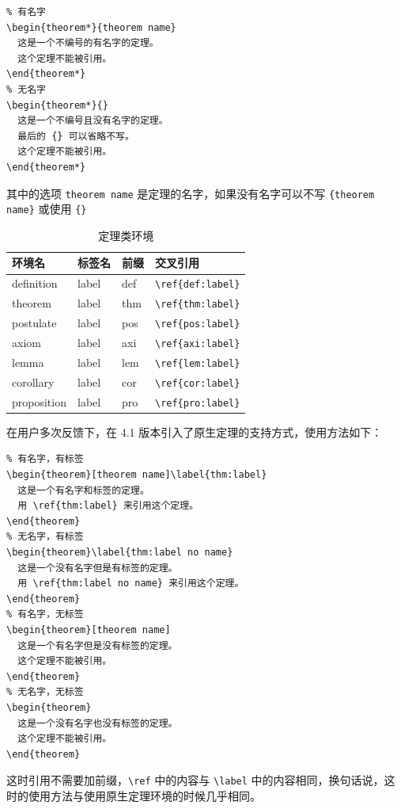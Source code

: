 \documentclass[lang=cn,newtx,10pt,scheme=chinese]{elegantbook}
\begin{document}
\begin{lstlisting}
% 有名字
\begin{theorem*}{theorem name}
  这是一个不编号的有名字的定理。
  这个定理不能被引用。
\end{theorem*}
% 无名字
\begin{theorem*}{}
  这是一个不编号且没有名字的定理。
  最后的 {} 可以省略不写。
  这个定理不能被引用。
\end{theorem*}
\end{lstlisting}
其中的选项 \lstinline{theorem name} 是定理的名字，如果没有名字可以不写 \lstinline|{theorem name}| 或使用 \lstinline|{}|

\begin{table}[htbp]
  \centering
  \caption{定理类环境}
    \begin{tabular}{llll}
    \toprule
    环境名 & 标签名 & 前缀 & 交叉引用 \\
    \midrule
    definition & label & def   & \lstinline|\ref{def:label}| \\
    theorem & label & thm   & \lstinline|\ref{thm:label}| \\
    postulate & label & pos & \lstinline|\ref{pos:label}| \\
    axiom & label & axi & \lstinline|\ref{axi:label}|\\
    lemma & label & lem   & \lstinline|\ref{lem:label}| \\
    corollary & label & cor   & \lstinline|\ref{cor:label}| \\
    proposition & label & pro   & \lstinline|\ref{pro:label}| \\
    \bottomrule
    \end{tabular}%
  \label{tab:theorem-class}%
\end{table}%

在用户多次反馈下，在 4.1 版本引入了原生定理的支持方式，使用方法如下：

\begin{lstlisting}
% 有名字，有标签
\begin{theorem}[theorem name]\label{thm:label}
  这是一个有名字和标签的定理。
  用 \ref{thm:label} 来引用这个定理。
\end{theorem}
% 无名字，有标签
\begin{theorem}\label{thm:label no name}
  这是一个没有名字但是有标签的定理。
  用 \ref{thm:label no name} 来引用这个定理。
\end{theorem}
% 有名字，无标签
\begin{theorem}[theorem name]
  这是一个有名字但是没有标签的定理。
  这个定理不能被引用。
\end{theorem}
% 无名字，无标签
\begin{theorem}
  这是一个没有名字也没有标签的定理。
  这个定理不能被引用。
\end{theorem}
\end{lstlisting}
这时引用不需要加前缀，\lstinline{\ref} 中的内容与 \lstinline{\label} 中的内容相同，换句话说，这时的使用方法与使用原生定理环境的时候几乎相同。
\end{document}
